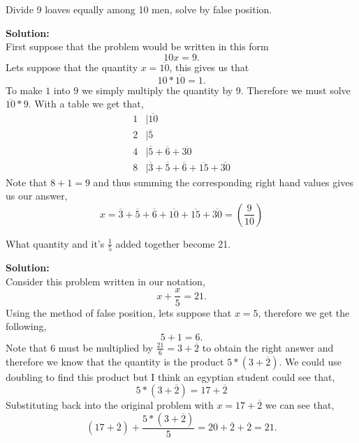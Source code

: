 \documentclass[12pt]{article}
\makeatletter
\theoremstyle{homework}
\newenvironment{exercise}[1]
{\def\@currentlabel{#1}\exercisecore}
{\endexercisecore}
\newcommand{\localhead}[1]{\par\smallskip\noindent\textbf{#1}\nobreak\\}%
\newcommand\solution{\localhead{Solution:}}
\makeatother
\begin{document}
    \begin{exercise}{19} Divide 9 loaves equally among 10 men, solve by false position.
        \solution First suppose that the problem would be written in this form 
        \begin{equation*}
            10x = 9.
        \end{equation*}
        Lets suppose that the quantity $x = \overline{10}$, this gives us that
        \begin{equation*}
            10*\overline{10} = 1.
        \end{equation*} 
        To make $1$ into $9$ we simply multiply the quantity by $9$. Therefore we must solve $\overline{10}*9$. With a table we get that,
        \begin{align*}
            1 &| \overline{10}\\
            2 &| \overline{5}\\
            4 &| \overline{5} + \overline{6} + \overline{30}\\
            8 &| \overline{3} + \overline{5} + \overline{6} + \overline{15} + \overline{30}
        \end{align*}
        Note that $8 + 1 = 9$ and thus summing the corresponding right hand values gives us our answer, 
        \begin{equation*}
            x = \overline{3} + \overline{5} + \overline{6} + \overline{10} + \overline{15} + \overline{30} = (\frac{9}{10})
        \end{equation*}

    \end{exercise}
    
    





    \begin{exercise}{20} What quantity and it's $\frac{1}{5}$ added together become 21.
        \solution Consider this problem written in our notation, 
        \begin{equation*}
            x + \frac{x}{5} = 21.
        \end{equation*} 
        Using the method of false position, lets suppose that $x = 5$, therefore we get the following, 
        \begin{equation*}
            5 + 1 = 6.
        \end{equation*}
        Note that 6 must be multiplied by $\frac{21}{6} = 3 + \overline{2}$ to obtain the right answer and therefore we know that the 
        quantity is the product $5*(3 + \overline{2})$. We could use doubling to find this product but I think an egyptian student could see that, 
        \begin{equation*}
        5*(3 + \overline{2}) = 17 + \overline{2}    
        \end{equation*}
        Substituting back into the original problem with $x = 17 + \overline{2}$ we can see that, 
        \begin{equation*}
            (17 + \overline{2}) + \frac{5*(3 + \overline{2})}{5} = 20 + \overline{2} + \overline{2} = 21.
        \end{equation*}


    \end{exercise}
\end{document}
